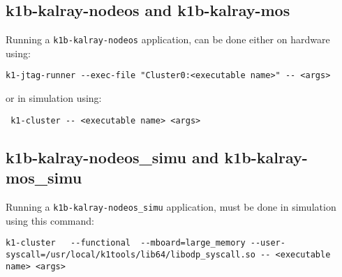 \documentclass{trkalray}
\begin{document}
\subsection{k1b-kalray-nodeos and k1b-kalray-mos}
Running a \texttt{k1b-kalray-nodeos} application, can be done either
on hardware using:
\begin{lstlisting}
k1-jtag-runner --exec-file "Cluster0:<executable name>" -- <args>
\end{lstlisting}
or in simulation using:
\begin{lstlisting}
 k1-cluster -- <executable name> <args>
\end{lstlisting}

\subsection{k1b-kalray-nodeos\_simu and k1b-kalray-mos\_simu}
Running a \texttt{k1b-kalray-nodeos\_simu} application, must be done in
simulation using this command:
\begin{lstlisting}
k1-cluster   --functional  --mboard=large_memory --user-syscall=/usr/local/k1tools/lib64/libodp_syscall.so -- <executable name> <args>
\end{lstlisting}
\end{document}
